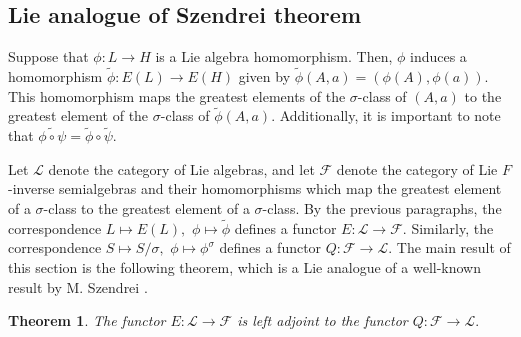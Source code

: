 \documentclass{amsart}
\newcommand{\0}{{\vartheta}}
\newtheorem{thm}{Theorem}[section]
\theoremstyle{definition}
\theoremstyle{remark}
\numberwithin{equation}{section}
\newtheorem*{Theorem A}{\textbf{Theorem A}}
\newtheorem*{Corollary E}{\textbf{Corollary E}}
\newtheorem*{Corollary F}{\textbf{Corollary F}}
\newtheorem*{Theorem B}{\textbf{Theorem B}}
\newtheorem*{Theorem C}{\textbf{Theorem C}}
\newtheorem*{Theorem D}{\textbf{Theorem B}}
\newtheorem*{p a}{\textbf{Proof of  Theorem A}}
\newtheorem*{p b}{\textbf{Proof of Theorem B}}
\newtheorem*{p c}{\textbf{Proof of  Theorem C}}
\newtheorem*{p d}{\textbf{Proof of  Theorem D}}
\begin{document}
\subsection{Lie analogue of Szendrei theorem }


Suppose that $\phi: L\to H$ is a  Lie algebra homomorphism. Then, $\phi$ induces a homomorphism $\widetilde \phi: E(L)\to E(H)$ given by $\widetilde\phi(A,a)=(\phi(A), \phi(a))$. This homomorphism maps the greatest elements of the $\sigma$-class of $(A,a)$ to the greatest element of the $\sigma$-class of $\widetilde\phi(A,a)$. Additionally, it is important to note that $\widetilde{\phi\circ\psi}=\widetilde\phi \circ\widetilde\psi$.



Let $\mathcal{L}$ denote the category of Lie algebras, and let $\mathcal{F}$ denote the category of Lie $F$-inverse semialgebras and their homomorphisms which map the greatest element of a $\sigma$-class to the greatest element of a $\sigma$-class. By the previous paragraphs, the correspondence $L\mapsto E(L),$  $\phi\mapsto \widetilde \phi$ defines a functor $E:\mathcal{L}\to \mathcal{F}$. Similarly, the correspondence $S\mapsto S/\sigma ,$   $\phi\mapsto \phi^\sigma$ defines a functor $Q:\mathcal{F}\to \mathcal{L}.$ The main result of this section is the following theorem, which is  a Lie analogue  of a well-known result by M. Szendrei \cite[Theorem 2]{Szendrei}. 
\begin{thm}\label{theorem-action}
    The functor $E:\mathcal{L}\to \mathcal{F}$ is left adjoint to the functor $Q:\mathcal{F}\to \mathcal{L}.$
\end{thm}
\end{document}
